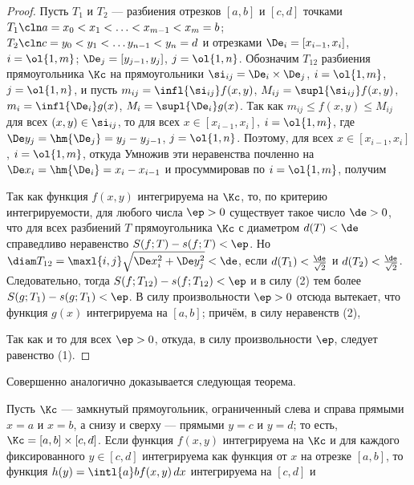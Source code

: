 \documentclass[a4paper]{article}
\begin{document}
\begin{proof}
Пусть $T_1$ и $T_2$ --- разбиения отрезков $[a,b]$ и $[c,d]$ точками
$T_1\cln a=x_0<x_1 < \ldots < x_{m-1}<x_m=b$; $T_2\cln
c=y_0<y_1<\ldots y_{n-1}<y_n=d$ и отрезками $\De_i = [x_{i-1},x_i]$,
$i=\ol{1,m}$; $\De_j = [y_{j-1},y_j]$, $j=\ol{1,n}$. Обозначим
$T_{12}$ разбиения прямоугольника $\Kc$ на прямоугольники
$\si_{ij}=\De_i\times\De_j$, $i=\ol{1,m}$, $j=\ol{1,n}$, и пусть
$m_{ij} = \infl{\si_{ij}} f(x,y)$, $M_{ij} = \supl{\si_{ij}}
f(x,y)$, $m_i = \infl{\De_i}g(x)$, $M_i=\supl{\De_i}g(x)$. Так как
$m_{ij}\le f(x,y)\le M_{ij}$ для всех $(x,y)\in\si_{ij}$, то
 для всех $x\in[x_{i-1},x_i]$, $i=\ol{1,m}$, где $\De y_j =
\hm{\De_j} = y_j-y_{j-1}$, $j=\ol{1,n}$. Поэтому, 
для всех $x\in[x_{i-1},x_i]$, $i=\ol{1,m}$, откуда  Умножив эти неравенства почленно на $\De
x_i=\hm{\De_i}=x_i-x_{i-1}$ и просуммировав по $i=\ol{1,m}$, получим

Так как функция $f(x,y)$ интегрируема на $\Kc$, то, по критерию
интегрируемости, для любого числа $\ep>0$ существует такое число
$\de>0$, что для всех разбиений $T$ прямоугольника $\Kc$ с диаметром
$d(T)<\de$ справедливо неравенство $S(f;T)-s(f;T)<\ep$. Но $\diam
T_{12} = \maxl{i,j} \sqrt{\De x_i^2+\De y_j^2}<\de$, если
$d(T_1)<\frac{\de}{\sqrt2}$ и $d(T_2)<\frac{\de}{\sqrt2}$.
Следовательно, тогда $S(f;T_{12})-s(f;T_{12})<\ep$ и в силу (2) тем
более $S(g;T_1)-s(g;T_1)<\ep$. В силу произвольности $\ep>0$ отсюда
вытекает, что функция $g(x)$ интегрируема на $[a,b]$; причём, в силу
неравенств (2), 

Так как и  то  для всех $\ep>0$,
откуда, в силу произвольности $\ep$, следует равенство (1).
\end{proof}

Совершенно аналогично доказывается следующая теорема.

\begin{theorem}
Пусть $\Kc$ --- замкнутый прямоугольник, ограниченный слева и справа
прямыми $x=a$ и $x=b$, а снизу и сверху --- прямыми $y=c$ и $y=d$;
то есть, $\Kc=[a,b]\times[c,d]$. Если функция $f(x,y)$ интегрируема
на $\Kc$ и для каждого фиксированного $y\in[c,d]$ интегрируема как
функция от $x$ на отрезке $[a,b]$, то функция $h(y) = \intl{a}b
f(x,y)\,dx$ интегрируема на $[c,d]$ и
\end{theorem}
\end{document}
